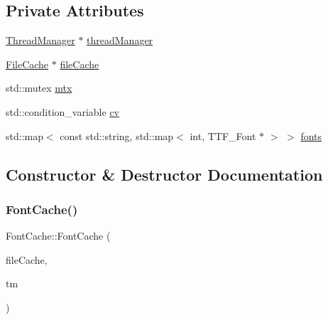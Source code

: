 \subsection*{Private Attributes}
\begin{DoxyCompactItemize}
\item 
\mbox{\hyperlink{classsage_1_1ThreadManager}{Thread\+Manager}} $\ast$ \mbox{\hyperlink{classsage_1_1FontCache_a175364ee3cbd642d347f6a6c0c974bf1}{thread\+Manager}}
\item 
\mbox{\hyperlink{classsage_1_1FileCache}{File\+Cache}} $\ast$ \mbox{\hyperlink{classsage_1_1FontCache_a9039e7ebe986ce1b35b5e1566d19e0de}{file\+Cache}}
\item 
std\+::mutex \mbox{\hyperlink{classsage_1_1FontCache_aa60c136f3ccb1516e80321ceea56cf53}{mtx}}
\item 
std\+::condition\+\_\+variable \mbox{\hyperlink{classsage_1_1FontCache_abe84a5350b1056e3ca812e5ac9d4928b}{cv}}
\item 
std\+::map$<$ const std\+::string, std\+::map$<$ int, T\+T\+F\+\_\+\+Font $\ast$ $>$ $>$ \mbox{\hyperlink{classsage_1_1FontCache_ad5f7cceb38a5946e67fe0ec39d79c85f}{fonts}}
\end{DoxyCompactItemize}


\subsection{Constructor \& Destructor Documentation}
\mbox{\label{classsage_1_1FontCache_ae8c3c01ce64871f70b4bab669015784e}} 
\subsubsection{\texorpdfstring{FontCache()}{FontCache()}}
{\footnotesize\ttfamily Font\+Cache\+::\+Font\+Cache (\begin{DoxyParamCaption}\item[{\mbox{\hyperlink{classsage_1_1FileCache}{File\+Cache}} $\ast$}]{file\+Cache,  }\item[{\mbox{\hyperlink{classsage_1_1ThreadManager}{Thread\+Manager}} $\ast$}]{tm }\end{DoxyParamCaption})}

\mbox{\label{classsage_1_1FontCache_a91c4f1c179ae27d846a9f0180ea2e0dc}} 
